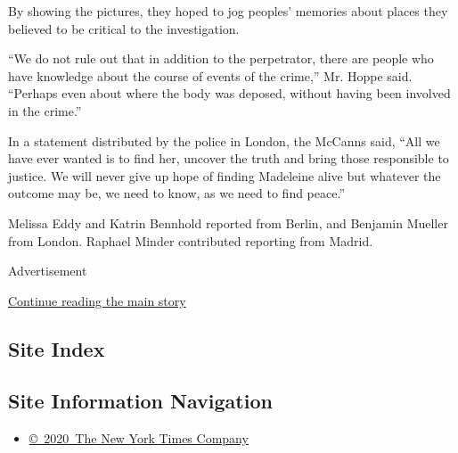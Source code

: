By showing the pictures, they hoped to jog peoples' memories about
places they believed to be critical to the investigation.

``We do not rule out that in addition to the perpetrator, there are
people who have knowledge about the course of events of the crime,'' Mr.
Hoppe said. ``Perhaps even about where the body was deposed, without
having been involved in the crime.''

In a statement distributed by the police in London, the McCanns said,
``All we have ever wanted is to find her, uncover the truth and bring
those responsible to justice. We will never give up hope of finding
Madeleine alive but whatever the outcome may be, we need to know, as we
need to find peace.''

Melissa Eddy and Katrin Bennhold reported from Berlin, and Benjamin
Mueller from London. Raphael Minder contributed reporting from Madrid.

Advertisement

\protect\hyperlink{after-bottom}{Continue reading the main story}

\hypertarget{site-index}{%
\subsection{Site Index}\label{site-index}}

\hypertarget{site-information-navigation}{%
\subsection{Site Information
Navigation}\label{site-information-navigation}}

\begin{itemize}
\tightlist
\item
  \href{https://help.nytimes.com/hc/en-us/articles/115014792127-Copyright-notice}{©~2020~The
  New York Times Company}
\end{itemize}

